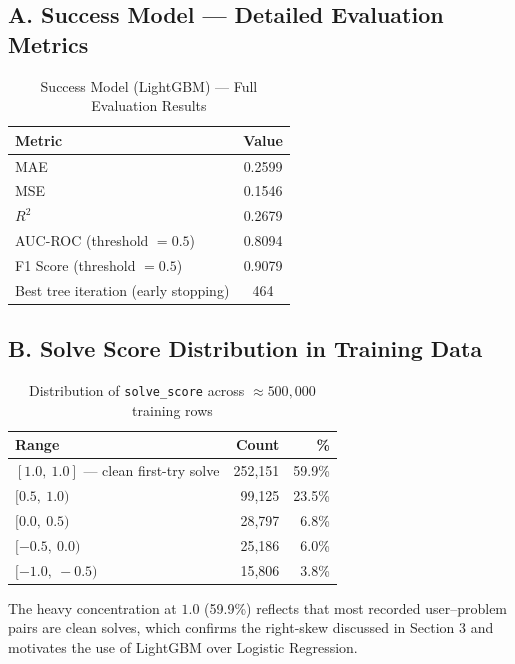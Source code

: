 \documentclass[12pt,a4paper]{article}
\begin{document}
\subsection*{A. Success Model — Detailed Evaluation Metrics}
 
\begin{table}[H]
\centering
\caption{Success Model (LightGBM) — Full Evaluation Results}
\begin{tabular}{|l|c|}
\hline
\textbf{Metric} & \textbf{Value} \\
\hline
MAE                         & 0.2599 \\
MSE                         & 0.1546 \\
$R^2$                       & 0.2679 \\
AUC-ROC (threshold $= 0.5$) & 0.8094 \\
F1 Score (threshold $= 0.5$) & 0.9079 \\
Best tree iteration (early stopping) & 464 \\
\hline
\end{tabular}
\end{table}
 
\subsection*{B. Solve Score Distribution in Training Data}
 
\begin{table}[H]
\centering
\caption{Distribution of \texttt{solve\_score} across ${\approx}500{,}000$ training rows}
\begin{tabular}{|l|r|r|}
\hline
\textbf{Range} & \textbf{Count} & \textbf{\%} \\
\hline
$[1.0,\ 1.0]$ — clean first-try solve & 252{,}151 & 59.9\% \\
$[0.5,\ 1.0)$                          &  99{,}125 & 23.5\% \\
$[0.0,\ 0.5)$                          &  28{,}797 &  6.8\% \\
$[-0.5,\ 0.0)$                         &  25{,}186 &  6.0\% \\
$[-1.0,\ -0.5)$                        &  15{,}806 &  3.8\% \\
\hline
\end{tabular}
\end{table}
 
The heavy concentration at $1.0$ (59.9\%) reflects that most recorded
user–problem pairs are clean solves, which confirms the right-skew discussed
in Section 3 and motivates the use of LightGBM over Logistic Regression.
 
\end{document}
